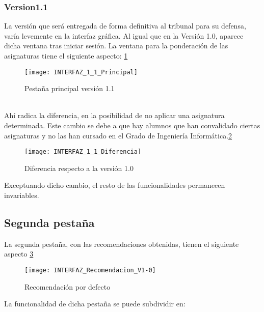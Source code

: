 \subsubsection{Version1.1}
La versión que será entregada de forma definitiva  al tribunal para su defensa, varía levemente en la interfaz gráfica. Al igual que en la Versión 1.0, aparece dicha ventana tras iniciar sesión. La ventana para la ponderación de las asignaturas tiene el siguiente aspecto: \ref{fig:E.2.5.1}
\begin{figure}[h]
\centering
\texttt{[image: INTERFAZ\_1\_1\_Principal]}
\caption{Pestaña principal versión 1.1}
\label{fig:E.2.5.1}
\end{figure}
\\Ahí radica la diferencia, en la posibilidad de no aplicar una asignatura determinada. Este cambio se debe a que hay alumnos que han convalidado ciertas asignaturas y no las han cursado en el Grado de Ingeniería Informática.\ref{fig:E.2.5.2}
\begin{figure}[h]
\centering
\texttt{[image: INTERFAZ\_1\_1\_Diferencia]}
\caption{Diferencia respecto a la  versión 1.0}
\label{fig:E.2.5.2}
\end{figure} 
Exceptuando dicho cambio, el resto de las funcionalidades permanecen invariables. 

\subsection{Segunda pestaña}
La segunda pestaña, con las recomendaciones obtenidas, tienen el siguiente aspecto \ref{fig:E.2.6}
\begin{figure}[h]
\centering
\texttt{[image: INTERFAZ\_Recomendacion\_V1-0]}
\caption{Recomendación por defecto}
\label{fig:E.2.6}
\end{figure}
La funcionalidad de dicha pestaña se puede subdividir en: 
